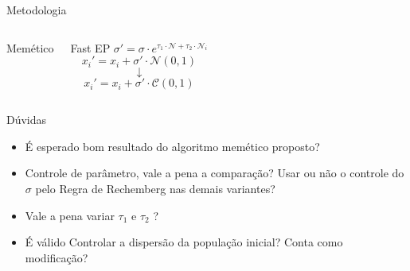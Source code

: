 \documentclass[pdf]{beamer}
\begin{document}
\begin{frame}{Metodologia}
\begin{columns}
\begin{block}{Memético}
		\end{block}
		\begin{block}{Fast EP}
			$ \sigma' = \sigma \cdot e^{\tau_1 \cdot \mathcal{N} + \tau_2 \cdot \mathcal{N}_i} $
			$$ x_i' = x_i + \sigma' \cdot \mathcal{N}(0, 1) $$
			$$\downarrow$$
			$$ x_i' = x_i + \sigma' \cdot \mathcal{C}(0, 1) $$ 
		\end{block}
	\end{columns}



\end{frame}


\begin{frame}{Dúvidas}
	\begin{itemize}
		\item É esperado bom resultado do algoritmo memético proposto?
		\item Controle de parâmetro, vale a pena a comparação? Usar ou não o controle do $ \sigma $ pelo Regra de Rechemberg nas demais variantes?
		\item Vale a pena variar $ \tau_1 $ e $ \tau_2 $ ?
		\item É válido Controlar a dispersão da população inicial? Conta como modificação?
	\end{itemize}
\end{frame}
\end{document}
